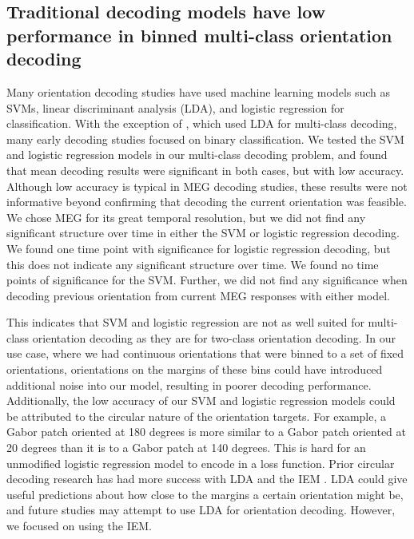 \documentclass[../main.tex]{subfiles}
\begin{document}
\subsection{Traditional decoding models have low performance in binned multi-class orientation decoding}
Many orientation decoding studies \citep{kamitani_tong_2005, haynes_rees_2005, cichy_ramirez_pantazis_2015} have used machine learning models such as SVMs, linear discriminant analysis (LDA), and logistic regression for classification. With the exception of \cite{kamitani_tong_2005}, which used LDA for multi-class decoding, many early decoding studies focused on binary classification. We tested the SVM and logistic regression models in our multi-class decoding problem, and found that mean decoding results were significant in both cases, but with low accuracy. Although low accuracy is typical in MEG decoding studies, these results were not informative beyond confirming that decoding the current orientation was feasible. We chose MEG for its great temporal resolution, but we did not find any significant structure over time in either the SVM or logistic regression decoding. We found one time point with significance for logistic regression decoding, but this does not indicate any significant structure over time. We found no time points of significance for the SVM. Further, we did not find any significance when decoding previous orientation from current MEG responses with either model. 

This indicates that SVM and logistic regression are not as well suited for multi-class orientation decoding as they are for two-class orientation decoding. In our use case, where we had continuous orientations that were binned to a set of fixed orientations, orientations on the margins of these bins could have introduced additional noise into our model, resulting in poorer decoding performance. Additionally, the low accuracy of our SVM and logistic regression models could be attributed to the circular nature of the orientation targets. For example, a Gabor patch oriented at 180 degrees is more similar to a Gabor patch oriented at 20 degrees than it is to a Gabor patch at 140 degrees. This is hard for an unmodified logistic regression model to encode in a loss function. Prior circular decoding research has had more success with LDA \citep{kamitani_tong_2005} and the IEM \citep{Brouwer09, Brouwer, GARCIA2013515, sprague_serences_2013, sprague_saproo_serences_2015}. LDA could give useful predictions about how close to the margins a certain orientation might be, and future studies may attempt to use LDA for orientation decoding. However, we focused on using the IEM.
\end{document}
